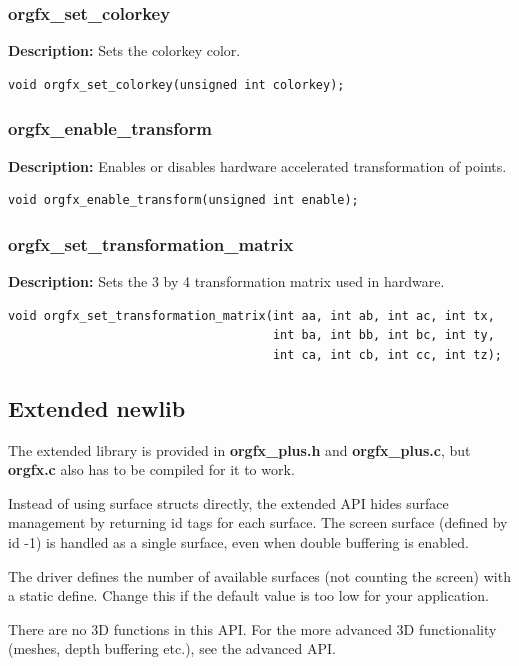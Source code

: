 \documentclass[10pt,a4paper]{article}
\begin{document}
\subsubsection{orgfx\_set\_colorkey}
\textbf{Description:} Sets the colorkey color.
\begin{lstlisting}
void orgfx_set_colorkey(unsigned int colorkey);
\end{lstlisting}

\subsubsection{orgfx\_enable\_transform}
\textbf{Description:} Enables or disables hardware accelerated transformation of points.
\begin{lstlisting}
void orgfx_enable_transform(unsigned int enable);
\end{lstlisting}

\subsubsection{orgfx\_set\_transformation\_matrix}
\textbf{Description:} Sets the 3 by 4 transformation matrix used in hardware.
\begin{lstlisting}
void orgfx_set_transformation_matrix(int aa, int ab, int ac, int tx,
                                     int ba, int bb, int bc, int ty,
                                     int ca, int cb, int cc, int tz);
\end{lstlisting}                           

\subsection{Extended newlib}
The extended library is provided in \textbf{orgfx\_plus.h} and \textbf{orgfx\_plus.c}, but \textbf{orgfx.c} also has to be compiled for it to work.

Instead of using surface structs directly, the extended API hides surface management by returning id tags for each surface. The screen surface (defined by id -1) is handled as a single surface, even when double buffering is enabled.

The driver defines the number of available surfaces (not counting the screen) with a static define. Change this if the default value is too low for your application.

There are no 3D functions in this API. For the more advanced 3D functionality (meshes, depth buffering etc.), see the advanced API.
\end{document}
